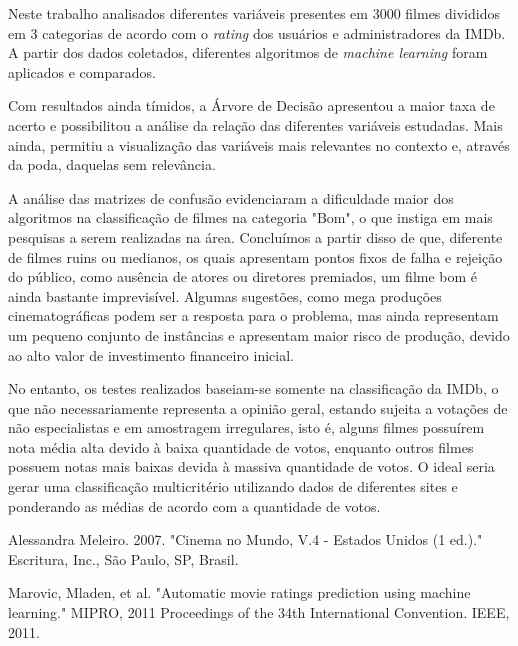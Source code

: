 \documentclass[twoside]{article}
\begin{document}
\begin{multicols}{2}
Neste trabalho analisados diferentes variáveis presentes em 3000 filmes divididos em 3 categorias de acordo com o \textit{rating} dos usuários e administradores da IMDb. A partir dos dados coletados, diferentes algoritmos de \textit{machine learning} foram aplicados e comparados.

Com resultados ainda tímidos, a Árvore de Decisão apresentou a maior taxa de acerto e possibilitou a análise da relação das diferentes variáveis estudadas. Mais ainda, permitiu a visualização das variáveis mais relevantes no contexto e, através da poda, daquelas sem relevância.

A análise das matrizes de confusão evidenciaram a dificuldade maior dos algoritmos na classificação de filmes na categoria "Bom", o que instiga em mais pesquisas a serem realizadas na área. Concluímos a partir disso de que, diferente de filmes ruins ou medianos, os quais apresentam pontos fixos de falha e rejeição do público, como ausência de atores ou diretores premiados, um filme bom é ainda bastante imprevisível. Algumas sugestões, como mega produções cinematográficas podem ser a resposta para o problema, mas ainda representam um pequeno conjunto de instâncias e apresentam maior risco de produção, devido ao alto valor de investimento financeiro inicial.

No entanto, os testes realizados baseiam-se somente na classificação da IMDb, o que não necessariamente representa a opinião geral, estando sujeita a votações de não especialistas e em amostragem irregulares, isto é, alguns filmes possuírem nota média alta devido à baixa quantidade de votos, enquanto outros filmes possuem notas mais baixas devida à massiva quantidade de votos. O ideal seria gerar uma classificação multicritério utilizando dados de diferentes sites e ponderando as médias de acordo com a quantidade de votos.


\begin{thebibliography}{9}


Alessandra Meleiro. 2007. "Cinema no Mundo, V.4 - Estados Unidos (1 ed.)." Escritura, Inc., São Paulo, SP, Brasil.

Marovic, Mladen, et al. "Automatic movie ratings prediction using machine learning." MIPRO, 2011 Proceedings of the 34th International Convention. IEEE, 2011.


\end{thebibliography}
\end{multicols}
\end{document}
